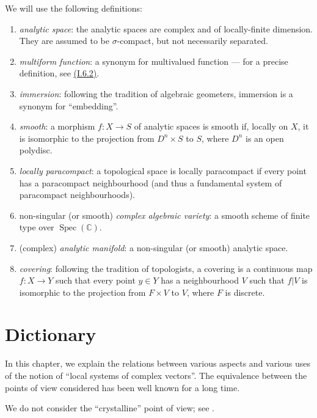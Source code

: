 \documentclass{report}
\DeclareMathOperator{\Spec}{Spec}
\newcommand{\oldpage}[1]{\marginpar{\footnotesize$\Big\vert$ \textit{p.~#1}}}
\begin{document}
We will use the following definitions:
\begin{enumerate}[({0.}1)]
  \item\label{0.1}
    \emph{analytic space}:
    the analytic spaces are complex and of locally-finite dimension.
    They are assumed to be $\sigma$-compact, but not necessarily separated.
  \item\label{0.2}
    \emph{multiform function}:
    a synonym for multivalued function --- for a precise definition, see \hyperref[I.6.2]{(I.6.2)}.
  \item\label{0.3}
    \emph{immersion}:
    following the tradition of algebraic geometers, immersion is a synonym for ``embedding''.
  \item\label{0.4}
    \emph{smooth}:
    a morphism $f\colon X\to S$ of analytic spaces is smooth if, locally on $X$, it is isomorphic to the projection from $D^n\times S$ to $S$, where $D^n$ is an open polydisc.
  \item\label{0.5}
    \emph{locally paracompact}:
    a topological space is locally paracompact if every point has a paracompact neighbourhood (and thus a fundamental system of paracompact neighbourhoods).
  \item\label{0.6}
    non-singular (or smooth) \emph{complex algebraic variety}:
    a smooth scheme of finite type over $\Spec(\mathbb{C})$.
  \item\label{0.7}
    (complex) \emph{analytic manifold}:
    a non-singular (or smooth) analytic space.
  \item\label{0.8}
    \emph{covering}:
    following the tradition of topologists, a covering is a continuous map $f\colon X\to Y$ such that every point $y\in Y$ has a neighbourhood $V$ such that $f|V$ is isomorphic to the projection from $F\times V$ to $V$, where $F$ is discrete.
\end{enumerate}


\renewcommand{\thechapter}{\Roman{chapter}}

\chapter{Dictionary}
\label{I}

\oldpage{3}
In this chapter, we explain the relations between various aspects and various uses of the notion of ``local systems of complex vectors''.
The equivalence between the points of view considered has been well known for a long time.

We do not consider the ``crystalline'' point of view;
see \cite{4,10}.
\end{document}
